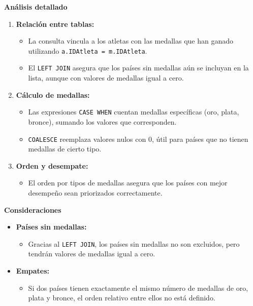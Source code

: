\textbf{Análisis detallado}

\begin{enumerate}
   \item \textbf{Relación entre tablas:}
   \begin{itemize}
       \item La consulta vincula a los atletas con las medallas que han ganado utilizando \texttt{a.IDAtleta = m.IDAtleta}.
       \item El \texttt{LEFT JOIN} asegura que los países sin medallas aún se incluyan en la lista, aunque con valores de medallas igual a cero.
   \end{itemize}

   \item \textbf{Cálculo de medallas:}
   \begin{itemize}
       \item Las expresiones \texttt{CASE WHEN} cuentan medallas específicas (oro, plata, bronce), sumando los valores que corresponden.
       \item \texttt{COALESCE} reemplaza valores nulos con 0, útil para países que no tienen medallas de cierto tipo.
   \end{itemize}

   \item \textbf{Orden y desempate:}
   \begin{itemize}
       \item El orden por tipos de medallas asegura que los países con mejor desempeño sean priorizados correctamente.
   \end{itemize}
\end{enumerate}

\textbf{Consideraciones}

\begin{itemize}
   \item \textbf{Países sin medallas:}
   \begin{itemize}
       \item Gracias al \texttt{LEFT JOIN}, los países sin medallas no son excluidos, pero tendrán valores de medallas igual a cero.
   \end{itemize}
   \item \textbf{Empates:}
   \begin{itemize}
       \item Si dos países tienen exactamente el mismo número de medallas de oro, plata y bronce, el orden relativo entre ellos no está definido.
   \end{itemize}
\end{itemize}

